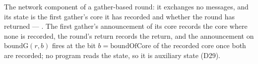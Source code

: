 \begin{definition}
  \label{def:aba-gbca-network}
  \leanok
  The network component of a gather-based round: it exchanges no messages, and its state is the first gather's core it has recorded and whether the round has returned --- .
  The first gather's announcement of its core records the core where none is recorded, the round's return records the return, and the announcement on $\mathrm{boundG}(r,b)$ fires at the bit $b = \mathrm{boundOfCore}$ of the recorded core once both are recorded; no program reads the state, so it is auxiliary state (D29).
\end{definition}
